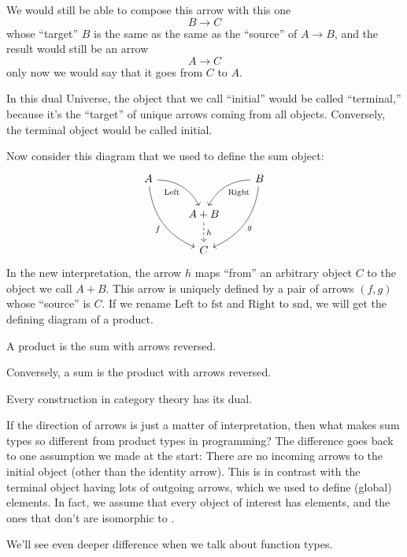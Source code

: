 \documentclass[DaoFP]{subfiles}
\begin{document}
We would still be able to compose this arrow with this one
\[B \to C\]
whose ``target'' $B$ is the same as the same as the ``source'' of $A \to B$, and the result would still be an arrow 
\[A \to C\]
 only now we would say that it goes from $C$ to $A$.

In this dual Universe, the object that we call ``initial'' would be called ``terminal,'' because it's the ``target'' of unique arrows coming from all objects. Conversely, the terminal object would be called initial.

Now consider this diagram that we used to define the sum object:
\[
 \begin{tikzcd}
 A
 \arrow[dr,  bend left, "\text{Left}"']
 \arrow[ddr, bend right, "f"']
 && B
 \arrow[dl, bend right, "\text{Right}"]
 \arrow[ddl, bend left, "g"]
 \\
&A + B
\arrow[d, dashed, "h"]
\\
& C
 \end{tikzcd}
\]
In the new interpretation, the arrow $h$ maps ``from'' an arbitrary object $C$ to the object we call $A + B$. This arrow is uniquely defined by a pair of arrows $(f, g)$ whose ``source'' is $C$. If we rename $\text{Left}$ to $\text{fst}$ and $\text{Right}$ to $\text{snd}$, we will get  the defining diagram of a product. 

A product is the sum with arrows reversed. 

Conversely, a sum is the product with arrows reversed. 

\medskip

Every construction in category theory has its dual.

\medskip

If the direction of arrows is just a matter of interpretation, then what makes sum types so different from product types in programming? The difference goes back to one assumption we made at the start: There are no incoming arrows to the initial object (other than the identity arrow). This is in contrast with the terminal object having lots of outgoing arrows, which we used to define (global) elements. In fact, we assume that every object of interest has elements, and the ones that don't are isomorphic to . 

We'll see even deeper difference when we talk about function types.
\end{document}
